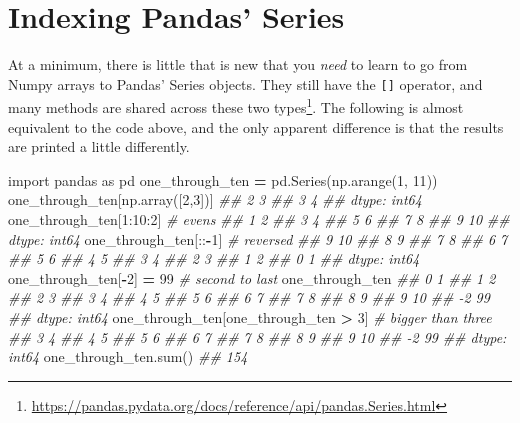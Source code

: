 \documentclass[12pt,krantz2]{krantz}
\makeatletter
\newenvironment{Shaded}{\begin{snugshade}}{\end{snugshade}}
\newcommand{\BuiltInTok}[1]{#1}
\newcommand{\CommentTok}[1]{\textcolor[rgb]{0.37,0.37,0.37}{\textit{#1}}}
\newcommand{\DecValTok}[1]{\textcolor[rgb]{0.06,0.06,0.06}{#1}}
\newcommand{\ImportTok}[1]{#1}
\newcommand{\NormalTok}[1]{#1}
\newcommand{\OperatorTok}[1]{\textcolor[rgb]{0.43,0.43,0.43}{\textbf{#1}}}
\renewcommand{\href}[2]{#2\footnote{\url{#1}}}
\newenvironment{kframe}{%
\medskip{}
\setlength{\fboxsep}{.8em}
 \def\at@end@of@kframe{}%
 \ifinner\ifhmode%
  \def\at@end@of@kframe{\end{minipage}}%
  \begin{minipage}{\columnwidth}%
 \fi\fi%
 \def\FrameCommand##1{\hskip\@totalleftmargin \hskip-\fboxsep
 \colorbox{shadecolor}{##1}\hskip-\fboxsep
     \hskip-\linewidth \hskip-\@totalleftmargin \hskip\columnwidth}%
 \MakeFramed {\advance\hsize-\width
   \@totalleftmargin\z@ \linewidth\hsize
   \@setminipage}}%
 {\par\unskip\endMakeFramed%
 \at@end@of@kframe}
\renewenvironment{Shaded}{\begin{kframe}}{\end{kframe}}
\makeatother
\begin{document}
\hypertarget{indexing-pandas-series}{%
\section{Indexing Pandas' Series}\label{indexing-pandas-series}}

At a minimum, there is little that is new that you \emph{need} to learn to go from Numpy arrays to Pandas' Series objects. They still have the \texttt{{[}{]}} operator, and \href{https://pandas.pydata.org/docs/reference/api/pandas.Series.html}{many methods are shared across these two types}. The following is almost equivalent to the code above, and the only apparent difference is that the results are printed a little differently.

\begin{Shaded}
\begin{Highlighting}[]
\ImportTok{import}\NormalTok{ pandas }\ImportTok{as}\NormalTok{ pd}
\NormalTok{one_through_ten }\OperatorTok{=}\NormalTok{ pd.Series(np.arange(}\DecValTok{1}\NormalTok{, }\DecValTok{11}\NormalTok{))}
\NormalTok{one_through_ten[np.array([}\DecValTok{2}\NormalTok{,}\DecValTok{3}\NormalTok{])]}
\CommentTok{## 2    3}
\CommentTok{## 3    4}
\CommentTok{## dtype: int64}
\NormalTok{one_through_ten[}\DecValTok{1}\NormalTok{:}\DecValTok{10}\NormalTok{:}\DecValTok{2}\NormalTok{] }\CommentTok{# evens}
\CommentTok{## 1     2}
\CommentTok{## 3     4}
\CommentTok{## 5     6}
\CommentTok{## 7     8}
\CommentTok{## 9    10}
\CommentTok{## dtype: int64}
\NormalTok{one_through_ten[::}\OperatorTok{-}\DecValTok{1}\NormalTok{] }\CommentTok{# reversed}
\CommentTok{## 9    10}
\CommentTok{## 8     9}
\CommentTok{## 7     8}
\CommentTok{## 6     7}
\CommentTok{## 5     6}
\CommentTok{## 4     5}
\CommentTok{## 3     4}
\CommentTok{## 2     3}
\CommentTok{## 1     2}
\CommentTok{## 0     1}
\CommentTok{## dtype: int64}
\NormalTok{one_through_ten[}\OperatorTok{-}\DecValTok{2}\NormalTok{] }\OperatorTok{=} \DecValTok{99} \CommentTok{# second to last}
\NormalTok{one_through_ten}
\CommentTok{##  0     1}
\CommentTok{##  1     2}
\CommentTok{##  2     3}
\CommentTok{##  3     4}
\CommentTok{##  4     5}
\CommentTok{##  5     6}
\CommentTok{##  6     7}
\CommentTok{##  7     8}
\CommentTok{##  8     9}
\CommentTok{##  9    10}
\CommentTok{## -2    99}
\CommentTok{## dtype: int64}
\NormalTok{one_through_ten[one_through_ten }\OperatorTok{>} \DecValTok{3}\NormalTok{] }\CommentTok{# bigger than three}
\CommentTok{##  3     4}
\CommentTok{##  4     5}
\CommentTok{##  5     6}
\CommentTok{##  6     7}
\CommentTok{##  7     8}
\CommentTok{##  8     9}
\CommentTok{##  9    10}
\CommentTok{## -2    99}
\CommentTok{## dtype: int64}
\NormalTok{one_through_ten.}\BuiltInTok{sum}\NormalTok{()}
\CommentTok{## 154}
\end{Highlighting}
\end{Shaded}
\end{document}
